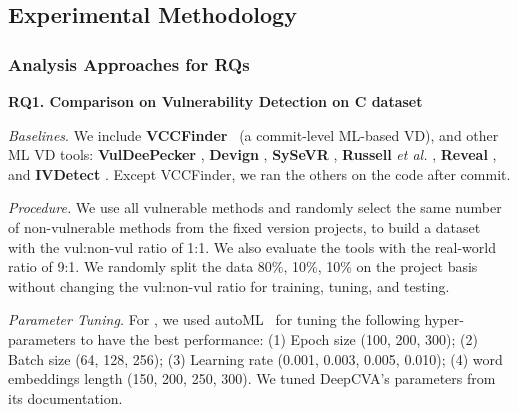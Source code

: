 \subsection{Experimental Methodology}
\label{method:sec}





\subsubsection{\textbf{Analysis Approaches for RQs\\}}

\noindent\textbf{RQ1. Comparison on Vulnerability Detection on C dataset}

\emph{Baselines}. We include {\bf VCCFinder}~\cite{perl2015vccfinder}
(a commit-level ML-based VD), and other ML VD tools:
\textbf{VulDeePecker} \cite{li2018vuldeepecker}, \textbf{Devign}
\cite{zhou2019devign}, \textbf{SySeVR} \cite{li2021sysevr},
\textbf{Russell} {\em et al.}  \cite{russell2018automated},
\textbf{Reveal} \cite{chakraborty2021deep}, and {\bf IVDetect}
\cite{li2021vulnerability}. Except VCCFinder, we ran the others
on the code after commit. 

\emph{Procedure.}  We use all vulnerable methods and randomly select
the same number of non-vulnerable methods from the fixed version
projects, to build a dataset with the vul:non-vul ratio of 1:1. We
also evaluate the tools with the real-world ratio of 9:1. We randomly split the
data 80\%, 10\%, 10\% on the project basis without changing the
vul:non-vul ratio for training, tuning, and testing.

\emph{Parameter Tuning.}  For {\tool}, we used
autoML~\cite{NNI} for tuning the following hyper-parameters to have the
best performance: (1) Epoch size (100, 200, 300); (2) Batch size (64,
128, 256); (3) Learning rate (0.001, 0.003, 0.005, 0.010); (4) word embeddings length (150, 200, 250, 300). We
tuned DeepCVA's parameters from its documentation.

